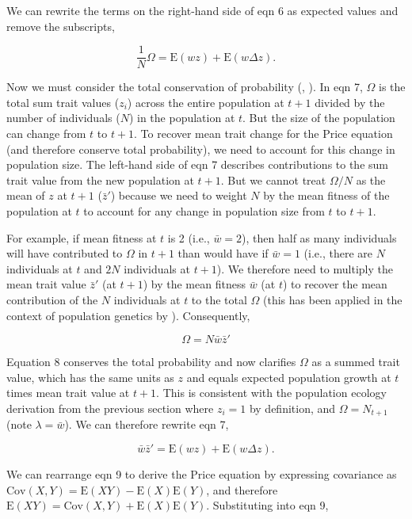\documentclass[
]{article}
\begin{document}
We can rewrite the terms on the right-hand side of eqn 6 as expected
values and remove the subscripts,

\[\frac{1}{N}\Omega = \mathrm{E}\left(w z \right) + \mathrm{E}\left( w \Delta z  \right).
\tag{7}
\]

Now we must consider the total conservation of probability
(, ).
In eqn 7, \(\Omega\) is the total sum trait values (\(z_{i}\)) across
the entire population at \(t + 1\) divided by the number of individuals
(\(N\)) in the population at \(t\). But the size of the population can
change from \(t\) to \(t + 1\). To recover mean trait change for the
Price equation (and therefore conserve total probability), we need to
account for this change in population size. The left-hand side of eqn 7
describes contributions to the sum trait value from the new population
at \(t + 1\). But we cannot treat \(\Omega/N\) as the mean of \(z\) at
\(t+1\) (\(\bar{z}'\)) because we need to weight \(N\) by the mean
fitness of the population at \(t\) to account for any change in
population size from \(t\) to \(t+1\).

For example, if mean fitness at \(t\) is 2 (i.e., \(\bar{w} = 2\)), then
half as many individuals will have contributed to \(\Omega\) in
\(t + 1\) than would have if \(\bar{w} = 1\) (i.e., there are \(N\)
individuals at \(t\) and \(2N\) individuals at \(t + 1\)). We therefore
need to multiply the mean trait value \(\bar{z}'\) (at \(t + 1\)) by the
mean fitness \(\bar{w}\) (at \(t\)) to recover the mean contribution of
the \(N\) individuals at \(t\) to the total \(\Omega\) (this has been
applied in the context of population genetics by
). Consequently,

\[\Omega = N\bar{w}\bar{z}'
\tag{8}
\]

Equation 8 conserves the total probability and now clarifies \(\Omega\)
as a summed trait value, which has the same units as \(z\) and equals
expected population growth at \(t\) times mean trait value at \(t + 1\).
This is consistent with the population ecology derivation from the
previous section where \(z_{i} = 1\) by definition, and
\(\Omega = N_{t+1}\) (note \(\lambda = \bar{w}\)). We can therefore
rewrite eqn 7,

\[\bar{w}\bar{z}' = \mathrm{E}\left(w z \right) + \mathrm{E}\left( w \Delta z  \right).
\tag{9}
\]

We can rearrange eqn 9 to derive the Price equation by expressing
covariance as
\(\mathrm{Cov}(X,Y) = \mathrm{E}(XY) - \mathrm{E}(X)\mathrm{E}(Y)\), and
therefore
\(\mathrm{E}(XY) = \mathrm{Cov}(X,Y) + \mathrm{E}(X)\mathrm{E}(Y)\).
Substituting into eqn 9,
\end{document}
